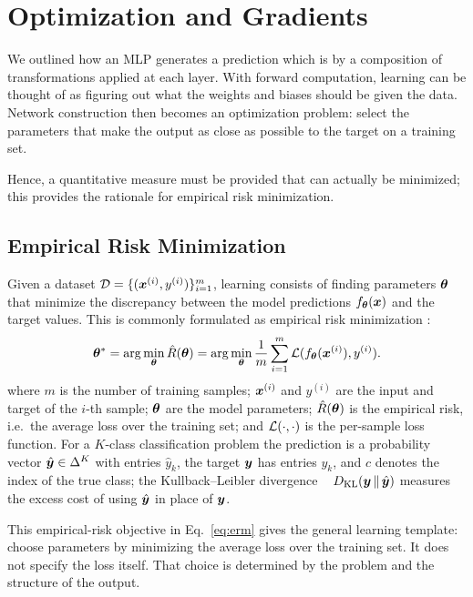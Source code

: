\section{Optimization and Gradients}\label{sec:Optimization and Gradients}

We outlined how an MLP generates a prediction which is by a composition of transformations applied at each layer. With forward computation, learning can be thought of as figuring out what the weights and biases should be given the data. Network construction then becomes an optimization problem: select the parameters that make the output as close as possible to the target on a training set.

Hence, a quantitative measure must be provided that can actually be minimized; this provides the rationale for empirical risk minimization.

\subsection{Empirical Risk Minimization}

Given a dataset $\mathcal{D} = \{(\bm{x}^{(i)}, y^{(i)})\}_{i=1}^{m}$, learning consists of finding parameters $\bm{\theta}$ that minimize the discrepancy between the model predictions $f_{\bm{\theta}}(\bm{x})$ and the target values. This is commonly formulated as empirical risk minimization \cite{Vapnik1998}:
\begin{equation}
    \bm{\theta}^* = \arg\min_{\bm{\theta}} \hat{R}(\bm{\theta}) = \arg\min_{\bm{\theta}} \frac{1}{m} \sum_{i=1}^{m} \mathcal{L}(f_{\bm{\theta}}(\bm{x}^{(i)}), y^{(i)}).
    \label{eq:erm}
\end{equation}
where $m$ is the number of training samples; $\bm{x}^{(i)}$ and $y^{(i)}$ are the input and target of the $i$-th sample; $\bm{\theta}$ are the model parameters; $\hat{R}(\bm{\theta})$ is the empirical risk, i.e.\ the average loss over the training set; and $\mathcal{L}(\cdot,\cdot)$ is the per-sample loss function. For a $K$-class classification problem the prediction is a probability vector $\hat{\bm{y}} \in \Delta^{K}$  with entries $\hat{y}_k$, the target $\bm{y}$ has entries $y_k$, and $c$ denotes the index of the true class; the Kullback--Leibler divergence ~\cite{cover2006}
$D_{\text{KL}}(\bm{y} \,\|\, \hat{\bm{y}})$ measures the excess cost of using $\hat{\bm{y}}$ in place of $\bm{y}$.

This empirical-risk objective in Eq.~\eqref{eq:erm} gives the general learning template: choose parameters by minimizing the average loss over the training set. It does not specify the loss itself. That choice is determined by the problem and the structure of the output.

